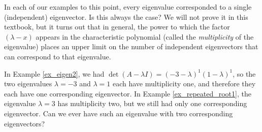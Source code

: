 \medskip

In each of our examples to this point, every eigenvalue corresponded to a single (independent) eigenvector. Is this always the case? We will not prove it in this textbook, but it turns out that in general, the power to which the factor $(\lambda - x)$ appears in the characteristic polynomial (called the \textit{multiplicity} of the eigenvalue) places an upper limit on the number of independent eigenvectors that can correspond to that eigenvalue.

In Example \ref{ex_eigen2}, we had $\det(A-\lambda I) = (-3-\lambda)^1(1-\lambda)^1$, so the two eigenvalues $\lambda = -3$ and $\lambda = 1$ each have multiplicity one, and therefore they each have one corresponding eigenvector. In Example \ref{ex_repeated_root1}, the eigenvalue $\lambda=3$ has multiplicity two, but we still had only one corresponding eigenvector. Can we ever have such an eigenvalue with two corresponding eigenvectors?

\medskip

